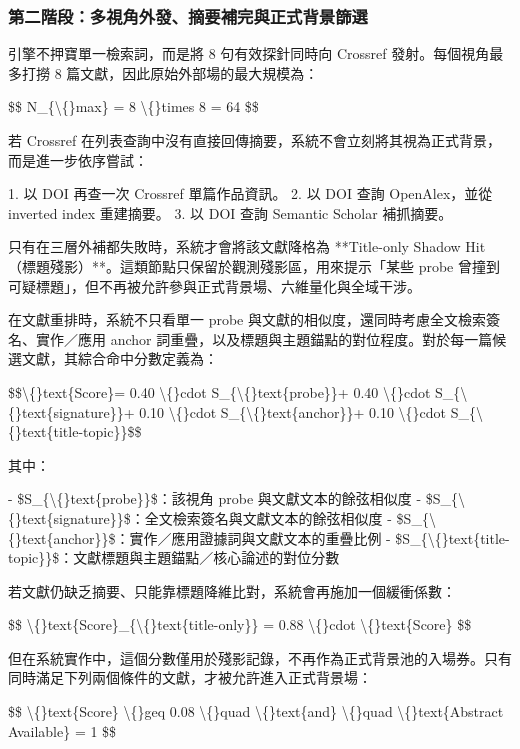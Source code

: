 \documentclass{article}
\begin{document}
\subsubsection{第二階段：多視角外發、摘要補完與正式背景篩選}

引擎不押寶單一檢索詞，而是將 8 句有效探針同時向 Crossref 發射。每個視角最多打撈 8 篇文獻，因此原始外部場的最大規模為：

\$\$
N\_\{\textbackslash\{\}max\} = 8 \textbackslash\{\}times 8 = 64
\$\$

若 Crossref 在列表查詢中沒有直接回傳摘要，系統不會立刻將其視為正式背景，而是進一步依序嘗試：

1. 以 DOI 再查一次 Crossref 單篇作品資訊。  
2. 以 DOI 查詢 OpenAlex，並從 inverted index 重建摘要。  
3. 以 DOI 查詢 Semantic Scholar 補抓摘要。  

只有在三層外補都失敗時，系統才會將該文獻降格為 **Title-only Shadow Hit（標題殘影）**。這類節點只保留於觀測殘影區，用來提示「某些 probe 曾撞到可疑標題」，但不再被允許參與正式背景場、六維量化與全域干涉。

在文獻重排時，系統不只看單一 probe 與文獻的相似度，還同時考慮全文檢索簽名、實作／應用 anchor 詞重疊，以及標題與主題錨點的對位程度。對於每一篇候選文獻，其綜合命中分數定義為：

\$\$\textbackslash\{\}text\{Score\}= 0.40 \textbackslash\{\}cdot S\_\{\textbackslash\{\}text\{probe\}\}+ 0.40 \textbackslash\{\}cdot S\_\{\textbackslash\{\}text\{signature\}\}+ 0.10 \textbackslash\{\}cdot S\_\{\textbackslash\{\}text\{anchor\}\}+ 0.10 \textbackslash\{\}cdot S\_\{\textbackslash\{\}text\{title-topic\}\}\$\$

其中：

- \$S\_\{\textbackslash\{\}text\{probe\}\}\$：該視角 probe 與文獻文本的餘弦相似度  
- \$S\_\{\textbackslash\{\}text\{signature\}\}\$：全文檢索簽名與文獻文本的餘弦相似度  
- \$S\_\{\textbackslash\{\}text\{anchor\}\}\$：實作／應用證據詞與文獻文本的重疊比例  
- \$S\_\{\textbackslash\{\}text\{title-topic\}\}\$：文獻標題與主題錨點／核心論述的對位分數  

若文獻仍缺乏摘要、只能靠標題降維比對，系統會再施加一個緩衝係數：

\$\$
\textbackslash\{\}text\{Score\}\_\{\textbackslash\{\}text\{title-only\}\} = 0.88 \textbackslash\{\}cdot \textbackslash\{\}text\{Score\}
\$\$

但在系統實作中，這個分數僅用於殘影記錄，不再作為正式背景池的入場券。只有同時滿足下列兩個條件的文獻，才被允許進入正式背景場：

\$\$
\textbackslash\{\}text\{Score\} \textbackslash\{\}geq 0.08
\textbackslash\{\}quad \textbackslash\{\}text\{and\} \textbackslash\{\}quad
\textbackslash\{\}text\{Abstract Available\} = 1
\$\$
\end{document}
